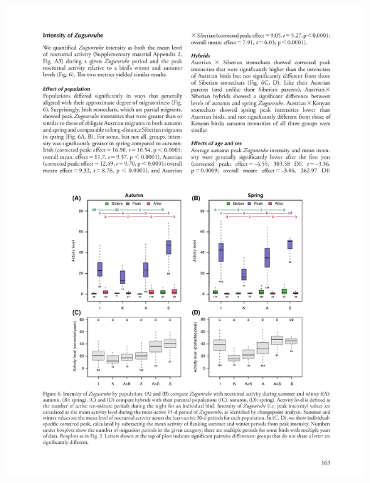 \documentclass[a4paper, twoside]{templates/ociamthesis}
\begin{document}
\begin{center}\includegraphics[width=1\linewidth]{pdf_chapters/zug/zug_crop_Part09} \end{center}
\end{document}
